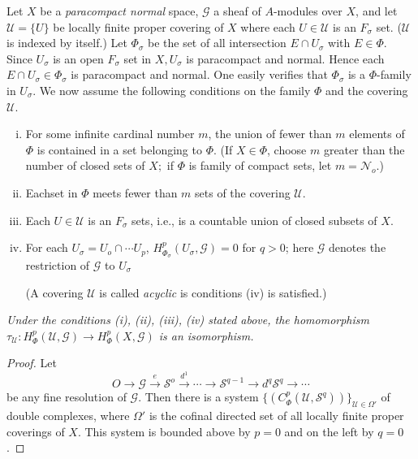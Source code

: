Let $X$ be a \textit{paracompact normal} space, $\mathscr{G}$ a sheaf
of $A$-modules over $X$, and let $\mathscr{U}=\{ U\}$ be locally
finite proper covering of $X$ where each $U \in \mathscr{U}$ is an $F_
\sigma$ set. ($\mathscr{U}$ is indexed by itself.) Let $\Phi_\sigma$
be the set of all intersection $E \cap U_ \sigma$ with $E \in
\Phi$. Since $U_\sigma$ is an open $F_\sigma$ set in $X,U_\sigma$
is paracompact and normal. Hence each $E \cap U_\sigma \in
\Phi_\sigma$ is paracompact and normal. One easily verifies that
$\Phi_\sigma$ is a $\Phi$-family in $U_\sigma$. We now assume the 
following conditions on the family $\Phi$ and the covering
$\mathscr{U}$. 
\begin{enumerate}[(i)]
\item For some infinite cardinal number $m$, the union of fewer than
  $m$ elements of $\Phi$ is contained in a set belonging to
  $\Phi$. (If $X \in \Phi$, choose $m$ greater than the number of
  closed sets of $X; $ if $\Phi$ is family of compact sets, let
  $m=\mathscr{N}_o$.) 

\item Each\pageoriginale set in $\Phi$ meets fewer than $m$ sets of
  the covering $\mathscr{U}$.  

\item Each $U \in \mathscr{U}$ is an $F_\sigma$ sets, i.e., is a
  countable union of closed subsets of $X$. 

\item For each $U_ \sigma=U_o\cap \cdots U_p$,
  $H^p_{\Phi_\sigma}(U_\sigma,\mathscr{G})=0$ for $q>0$; here
  $\mathscr{G}$ denotes the restriction of $\mathscr{G}$ to $U_\sigma$  

(A covering $\mathscr{U}$ is called \textit{acyclic} is conditions
  (iv) is satisfied.) 
\end{enumerate}

\textit{Under the conditions {\em (i), (ii), (iii), (iv)} stated
  above, the homomorphism $\tau _\mathscr{U}: H^p_ \Phi
  (\mathscr{U},\mathscr{G}) \to H^p _ \Phi (X,\mathscr{G})$ is an
  isomorphism.}  

\begin{proof}
Let
$$
O \to \mathscr{G} \xrightarrow{e} \mathscr{S}^o \xrightarrow{d^1}
\cdots \to \mathscr{S}^{q-1} \rightarrow{d^q} \mathscr{S}^q \to \cdots 
$$
be any fine resolution of $\mathscr{G}$. Then there is a system $\{
(C^p _ \Phi (\mathscr{U},\mathscr{S}^q)) \}_{\mathscr{U} \in \Omega'}$
of double complexes, where $\Omega'$ is the cofinal directed set of all
locally finite proper coverings of $X$. This system is bounded above
by $p=0$ and on the left by $q=0$. 
\end{proof}

